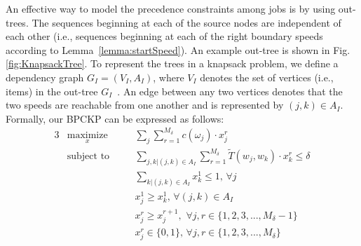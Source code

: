 An effective way to model the precedence constraints among jobs is by using out-trees.
The sequences beginning at each of the source nodes are independent of each other (i.e., sequences beginning at each of the right boundary speeds according to Lemma~\ref{lemma:startSpeed}).
An example out-tree is shown in Fig. \ref{fig:KnapsackTree}.
To represent the trees in a knapsack problem, we define a dependency graph $G_I=(V_I, A_I)$, where $V_I$ denotes the set of vertices (i.e., items) in the out-tree $G_I$~\cite{kellerer_knapsack_2004}.
An edge between any two vertices denotes that the two speeds are reachable from one another and is represented by $(j,k)\in A_I$.
Formally, our BPCKP can be expressed as follows:
\begin{alignat}{3}
    & \underset{x}{\text{maximize}}
    & \quad & \sum_{j}\sum_{r=1}^{M_\delta} c(\omega_j) \cdot x_j^{r} \label{eqn:maxDemand}\\
    & \text{subject to}
    & \quad & \sum_{j, k | (j,k) \in A_I} \sum_{r=1}^{M_\delta}  \tilde{T}(w_j, w_k) \cdot x_k^r \leq \delta \label{eqn:kp-cons}\\
    & & \quad & \sum_{k|(j,k)\in A_I} x_k^1 \leq 1, \, \forall j \label{eqn:singleKnapsackPath}\\
    & & \quad & x_j^1 \geq x_k^1, \, \forall (j,k)\in A_I \label{eqn:precedenceConstraint}\\
    & & \quad & x_j^r \geq x_j^{r+1}, \,\, \forall j, r \in \{1,2,3,...,M_\delta-1\} \label{eqn:multipleJobRestriction}\\
     & & \quad &x_j^r \in \{0,1\},\,\forall j,  r \in \{1,2,3,...,M_\delta\} \label{eqn:binaryXValue}
\end{alignat}
